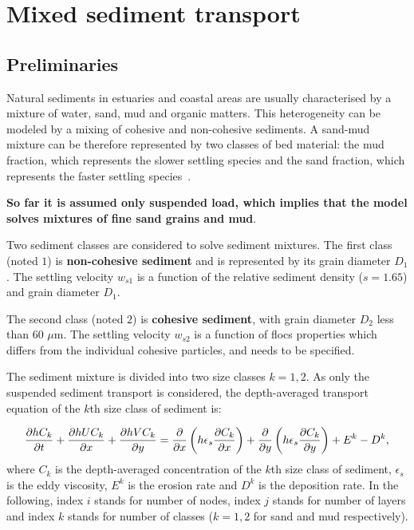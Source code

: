\chapter[Mixed sediment]{Mixed sediment transport}

\section{Preliminaries}
Natural  sediments  in  estuaries  and  coastal  areas  are  usually characterised  by  a  mixture  of water, sand, mud and organic matters. This heterogeneity can be modeled by a mixing of cohesive and  non-cohesive sediments. A sand-mud mixture can be therefore represented by two classes of bed material: the mud fraction, which represents the slower settling species and the sand fraction, which represents the faster settling species~\cite{Lan12}.

\textbf{So far it is assumed only suspended load,
which implies that the model solves mixtures of fine sand grains and
mud}.

Two sediment classes are considered to solve sediment mixtures. The first class (noted $1$) is \textbf{non-cohesive sediment} and is represented by its grain diameter $D_1$. The
settling velocity $w_{s1}$ is a function of the relative sediment density
($s=1.65$) and grain diameter $D_1$. 

The second class (noted $2$) is \textbf{cohesive sediment}, with grain diameter $D_2$ less than $60$
$\mu$m. The settling velocity $w_{s2}$ is a function of flocs properties which
differs from the individual cohesive particles, and needs to be specified. 

The sediment mixture is divided into two size classes $k=1,2$. As only the suspended sediment transport is considered, the depth-averaged transport equation of the $k$th size class of sediment is:

\begin{equation}\label{eq:ADE}
\frac{\partial hC_k}{\partial t} + \frac{\partial hUC_k}{\partial
x} + \frac{\partial hVC_k}{\partial y} =\frac{\partial }{%
\partial x} \left(h\epsilon_s\frac{\partial C_k}{\partial x} \right) +%
\frac{\partial }{\partial y} \left( h\epsilon_s\frac{\partial C_k}{%
\partial y} \right)+E^k - D^k, 
\end{equation}%
where $C_k$ is the depth-averaged concentration of the $k$th size class of sediment, $\epsilon_s$ is the eddy viscosity, $E^k$ is the erosion rate and $D^k$ is the deposition rate. In the following, index $i$ stands for number of nodes, index $j$ stands for number of layers and index $k$ stands for number of classes ($k=1,2$ for sand and mud respectively).\\

